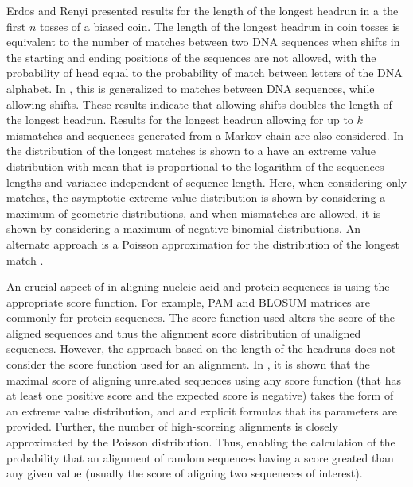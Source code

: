 Erdos and Renyi \citep{erdos1975length} presented results for the length
of the longest headrun in a the first $n$ tosses of a biased coin.  The
length of the longest headrun in coin tosses is equivalent to the number
of matches between two DNA sequences when shifts in the starting and
ending positions of the sequences are not allowed, with the probability
of head equal to the probability of match between letters of the DNA
alphabet.
In \citep{arratia1985erdos}, this is generalized to matches between DNA
sequences, while allowing shifts. These results indicate that allowing
shifts doubles the length of the longest headrun. Results for the
longest headrun allowing for up to $k$ mismatches and sequences
generated from a Markov chain are also considered.
In \citep{arratia1986extreme,gordon1986extreme} the distribution of the
longest matches is shown to a have an extreme value distribution with
mean that is proportional to the logarithm of the sequences lengths and
variance independent of sequence length. Here, when considering only
matches, the asymptotic extreme value distribution is shown by
considering a maximum of geometric distributions, and when mismatches
are allowed, it is shown by considering a maximum of negative binomial
distributions.
An alternate approach is a Poisson approximation for the distribution of
the longest match \citep{arratia1989erdos}.

An crucial aspect of in aligning nucleic acid and protein sequences is
using the appropriate score function. For example, PAM
\citep{dayhoff197822} and BLOSUM \citep{henikoff1992amino} matrices are
commonly for protein sequences.  The score function used alters the
score of the aligned sequences and thus the alignment score distribution
of unaligned sequences.
However, the approach based on the length of the headruns does not
consider the score function used for an alignment.
%
In \citep{karlin1990methods,karlin1990statistical}, it is shown that the
maximal score of aligning unrelated sequences using any score function
(that has at least one positive score and the expected score is
negative) takes the form of an extreme value distribution, and and
explicit formulas that its parameters are provided. Further, the number
of high-scoreing alignments is closely approximated by the Poisson
distribution.
%
Thus, enabling the calculation of the probability that an alignment of
random sequences having a score greated than any given value (usually
the score of aligning two sequeneces of interest).

